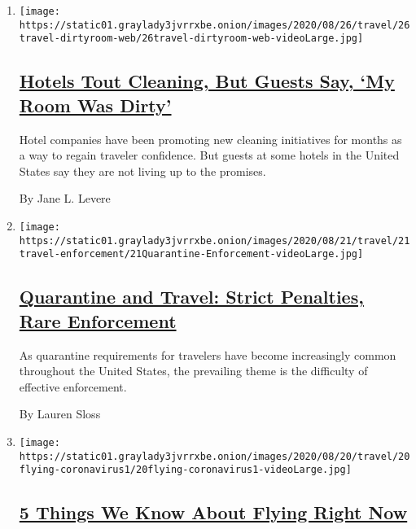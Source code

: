 \begin{enumerate}
\def\labelenumi{\arabic{enumi}.}
\item
  \texttt{[image: https://static01.graylady3jvrrxbe.onion/images/2020/08/26/travel/26travel-dirtyroom-web/26travel-dirtyroom-web-videoLarge.jpg]}

  \hypertarget{hotels-tout-cleaning-but-guests-say-my-room-was-dirty}{%
  \subsection{\texorpdfstring{\href{/2020/08/26/travel/virus-hotels-cleaning.html}{Hotels
  Tout Cleaning, But Guests Say, `My Room Was
  Dirty'}}{Hotels Tout Cleaning, But Guests Say, `My Room Was Dirty'}}\label{hotels-tout-cleaning-but-guests-say-my-room-was-dirty}}

  Hotel companies have been promoting new cleaning initiatives for
  months as a way to regain traveler confidence. But guests at some
  hotels in the United States say they are not living up to the
  promises.

  By Jane L. Levere
\item
  \texttt{[image: https://static01.graylady3jvrrxbe.onion/images/2020/08/21/travel/21travel-enforcement/21Quarantine-Enforcement-videoLarge.jpg]}

  \hypertarget{quarantine-and-travel-strict-penalties-rare-enforcement}{%
  \subsection{\texorpdfstring{\href{/2020/08/21/travel/quarantine-enforcement.html}{Quarantine
  and Travel: Strict Penalties, Rare
  Enforcement}}{Quarantine and Travel: Strict Penalties, Rare Enforcement}}\label{quarantine-and-travel-strict-penalties-rare-enforcement}}

  As quarantine requirements for travelers have become increasingly
  common throughout the United States, the prevailing theme is the
  difficulty of effective enforcement.

  By Lauren Sloss
\item
  \texttt{[image: https://static01.graylady3jvrrxbe.onion/images/2020/08/20/travel/20flying-coronavirus1/20flying-coronavirus1-videoLarge.jpg]}

  \hypertarget{5-things-we-know-about-flying-right-now}{%
  \subsection{\texorpdfstring{\href{/2020/08/20/travel/airplanes-coronavirus.html}{5
  Things We Know About Flying Right
  Now}}{5 Things We Know About Flying Right Now}}\label{5-things-we-know-about-flying-right-now}}


\end{enumerate}
